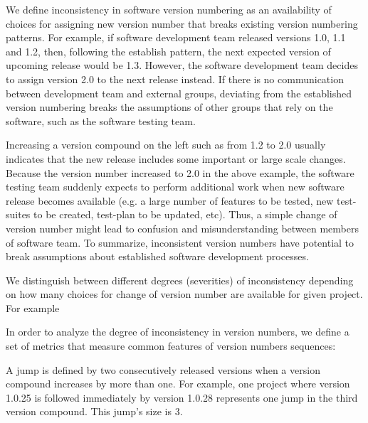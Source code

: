 \documentclass[conference]{IEEEtran}
\begin{document}
We define inconsistency in software version numbering as an availability of choices for assigning new version number that breaks existing version numbering patterns. 
For example, if software development team released versions 1.0, 1.1 and 1.2, then, following the establish pattern, the next expected version of upcoming release would be 1.3. 
However, the software development team decides to assign version 2.0 to the next release instead.
If there is no communication between development team and external groups, deviating from the established version numbering breaks the assumptions of other groups that rely on the software, such as the software testing team.

Increasing a version compound on the left such as from 1.2 to 2.0 usually indicates that the new release includes some important or large scale changes. Because the version number increased to 2.0 in the above example,  the software testing team suddenly expects to perform additional work when new software release becomes available (e.g. a large number of features to be tested, new test-suites to be created, test-plan to be updated, etc).
Thus, a simple change of version number might lead to confusion and misunderstanding between members of software team. 
To summarize, inconsistent version numbers have potential to break assumptions about established software development processes. 

We distinguish between different degrees (severities) of inconsistency depending on how many choices for change of version number are available for given project. For example 

In order to analyze the degree of inconsistency in version numbers, we define 
a set of metrics that measure common features of version numbers sequences: 
 
 A jump is defined by two consecutively released versions when a version compound increases by more than one.
For example, one project where version 1.0.25 is followed immediately by version 1.0.28 represents one jump in the third version compound. This jump's size is 3.
\end{document}
